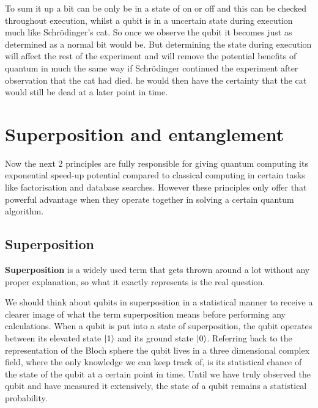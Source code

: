 To sum it up a bit can be only be in a state of on or off and this can be checked throughout execution, whilst a qubit is in a uncertain state during execution much like Schrödinger's cat. So once we observe the qubit it becomes just as determined as a normal bit would be. But determining the state during execution will affect the rest of the experiment and will remove the potential benefits of quantum in much the same way if Schrödinger continued the experiment after observation that the cat had died. he would then have the certainty that the cat would still be dead at a later point in time.

\section{Superposition and entanglement}

Now the next 2 principles are fully responsible for giving quantum computing its exponential speed-up potential compared to classical computing in certain tasks like factorisation and database searches. However these principles only offer that powerful advantage when they operate together in solving a certain quantum algorithm. 

\subsection{Superposition}
\textbf{Superposition} is a widely used term that gets thrown around a lot without any proper explanation, so what it exactly represents is the real question.

We should think about qubits in superposition in a statistical manner to receive a clearer image of what the term superposition means before performing any calculations. When a qubit is put into a state of superposition, the qubit operates between its elevated state $\ket{1}$ and its ground state $\ket{0}$. Referring back to the representation of the Bloch sphere the qubit lives in a three dimensional complex field, where the only knowledge we can keep track of, is its statistical chance of the state of the qubit at a certain point in time. Until we have truly observed the qubit and have measured it extensively, the state of a qubit remains a statistical probability.

